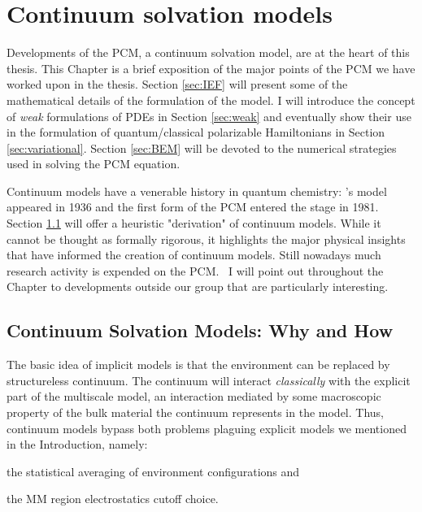 \chapter{Continuum solvation models}\label{ch:CSM}

Developments of the \ac{PCM}, a continuum solvation model, are at the
heart of this thesis.
This Chapter is a brief exposition of the major points of the \acs{PCM}
we have worked upon in the thesis.
Section \ref{sec:IEF} will present some of the mathematical details of the
formulation of the model. I will introduce the concept of \emph{weak}
formulations of \acp{PDE} in Section \ref{sec:weak} and eventually show their
use in the formulation of quantum/classical polarizable Hamiltonians in
Section \ref{sec:variational}.
Section \ref{sec:BEM} will be devoted to the numerical strategies used
in solving the \acs{PCM} equation.

Continuum models have a venerable history in quantum chemistry:
\citeauthor{Onsager1936-wf}'s model\autocite{Onsager1936-wf} appeared in
1936 and the first form of the \acs{PCM} entered the stage in
1981.~\autocite{Miertus1981-mm}
Section \ref{sec:CSM-why-how} will offer a heuristic "derivation" of
continuum models.
While it cannot be thought as formally rigorous, it highlights the major
physical insights that have informed the creation of continuum models.
Still nowadays much research activity is expended on the
\acs{PCM}.~\autocite{Tomasi2011-un, Mennucci2012-dv, Lipparini2016-mo}
I will point out throughout the Chapter to developments outside our
group that are particularly interesting.

\pagebreak

\section{Continuum Solvation Models: Why and How}\label{sec:CSM-why-how}

The basic idea of implicit models is that the environment can
be replaced by structureless continuum. The continuum will interact
\emph{classically} with the explicit part of the multiscale model, an
interaction mediated by some macroscopic property of the bulk material
the continuum represents in the model.
Thus, continuum models bypass both problems plaguing explicit models we
mentioned in the Introduction, namely:
\begin{enumerate*}[label={\alph*)},font={\color{PMS1797}}]
\item the statistical averaging of environment configurations and
\item the \acs{MM} region electrostatics cutoff choice.
\end{enumerate*}

